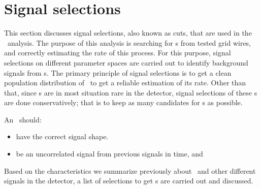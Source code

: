 \section{Signal selections}
\label{sec:cuts}
This section discusses signal selections, also known as cuts, that are used in the \gtest\ analysis. The purpose of this analysis is searching for \ees s from tested grid wires, and correctly estimating the rate of this process. For this purpose,  signal selections on different parameter spaces are carried out to identify background signals from \ees s.  The primary principle of signal selections is to get a clean population distribution of \ees\ to get a reliable estimation of its rate. Other than that, since \ees s are in most situation rare in the detector, signal selections of these \ees s are done conservatively; that is to keep as many candidates for \ees s as possible. 

An \ees\ should: 
\begin{itemize}
\item have the correct signal shape.
\item be an uncorrelated signal from previous signals in time, and
\end{itemize}

Based on the characteristics we summarize previously about \ees\ and other different signals in the detector, a list of selections to get \ees s are carried out and discussed.     

